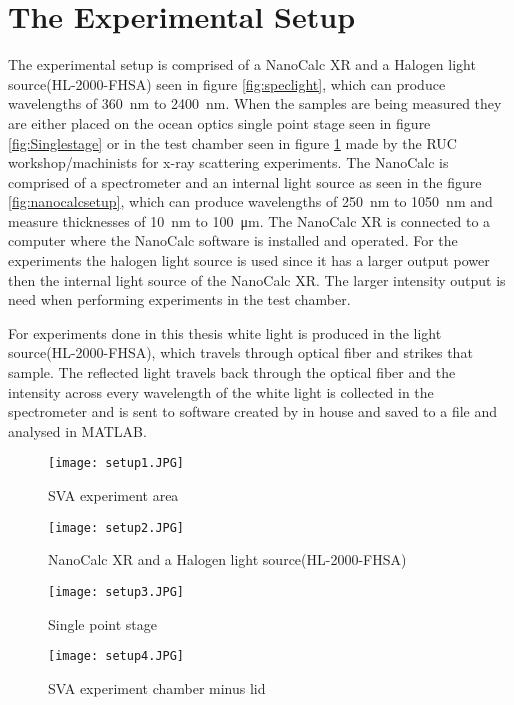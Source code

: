 \documentclass[MasterThesisMain.tex]{subfiles}
\begin{document}
\section{The Experimental Setup}
The experimental setup is comprised of a NanoCalc XR and a Halogen light source(HL-2000-FHSA) seen in figure \ref{fig:speclight}, which can produce wavelengths of \SI{360}{\nano\meter} to \SI{2400}{\nano\meter}. When the samples are being measured they are either placed on the ocean optics single point stage seen in figure \ref{fig:Singlestage} or in the test chamber seen in figure \ref{fig:SVAchamber} made by the RUC workshop/machinists for x-ray scattering experiments. The NanoCalc is comprised of a spectrometer and an internal light source as seen in the figure \ref{fig:nanocalcsetup}, which can produce wavelengths of \SI{250}{\nano\meter} to \SI{1050}{\nano\meter} and measure thicknesses of \SI{10}{\nano\meter} to \SI{100}{\micro\meter}. The NanoCalc XR is connected to a computer where the NanoCalc software is installed and operated. For the experiments the halogen light source is used since it has a larger output power then the internal light source of the NanoCalc XR. The larger intensity output is need when performing experiments in the test chamber. 

For experiments done in this thesis white light is produced in the light source(HL-2000-FHSA), which travels through optical fiber and strikes that sample. The reflected light travels back through the optical fiber and the intensity across every wavelength of the white light is collected in the spectrometer and is sent to software created by in house and saved to a file and analysed in MATLAB\textsuperscript{\textregistered}.  
	
	\begin{figure}[ht] 
	  \begin{minipage}[b]{0.5\linewidth}
	    \centering
	    \texttt{[image: setup1.JPG]} 
	    \caption{SVA experiment area}
	    \label{fig:exparea}  
	    \vspace{4ex}
	  \end{minipage}%
	  \begin{minipage}[b]{0.5\linewidth}
	    \centering
	    \texttt{[image: setup2.JPG]} 
	    \caption{NanoCalc XR and a Halogen light source(HL-2000-FHSA)}
	    \label{fig:speclight} 
	    \vspace{4ex}
	  \end{minipage} 
	  \begin{minipage}[b]{0.5\linewidth}
	    \centering
	    \texttt{[image: setup3.JPG]} 
	    \caption{Single point stage} 
	    \label{fig:Singlestage}
	    \vspace{4ex}
	  \end{minipage}%
	  \begin{minipage}[b]{0.5\linewidth}
	    \centering
	    \texttt{[image: setup4.JPG]} 
	    \caption{SVA experiment chamber minus lid}
	    \label{fig:SVAchamber} 
	    \vspace{4ex}
	  \end{minipage} 
	\end{figure}
	
\end{document}
